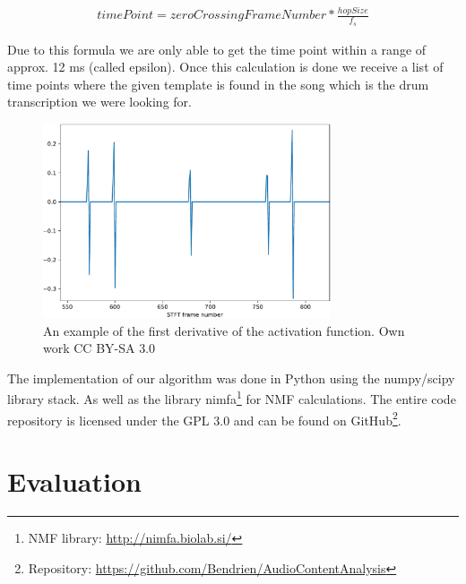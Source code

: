 \documentclass{article}
\begin{document}
\begin{align*}
\label{eq:timePoint}
timePoint = zeroCrossingFrameNumber * \frac{hopSize}{f_s}
\end{align*}

Due to this formula we are only able to get the time point within a range of approx. 12 ms (called epsilon).
Once this calculation is done we receive a list of time points where the given template is found in the song which is the drum transcription we were looking for.

\begin{figure}[htb]

\begin{minipage}[b]{1.0\linewidth}
  \centering
  \centerline{\includegraphics[width=8.5cm]{figures/Ableitung}}
  \medskip
\end{minipage}

\caption{An example of the first derivative of the activation function. \scriptsize{\textsf{\textcopyright} Own work CC BY-SA 3.0}}
\label{fig:Ableitung}

\end{figure}


The implementation of our algorithm was done in Python using the numpy/scipy library stack. 
As well as the library nimfa\footnote{NMF library: \url{http://nimfa.biolab.si/}} for NMF calculations.
The entire code repository is licensed under the GPL 3.0 and can be found on GitHub\footnote{Repository: \url{https://github.com/Bendrien/AudioContentAnalysis}}.




\section{Evaluation}
\label{sec:evaluation}
\end{document}
